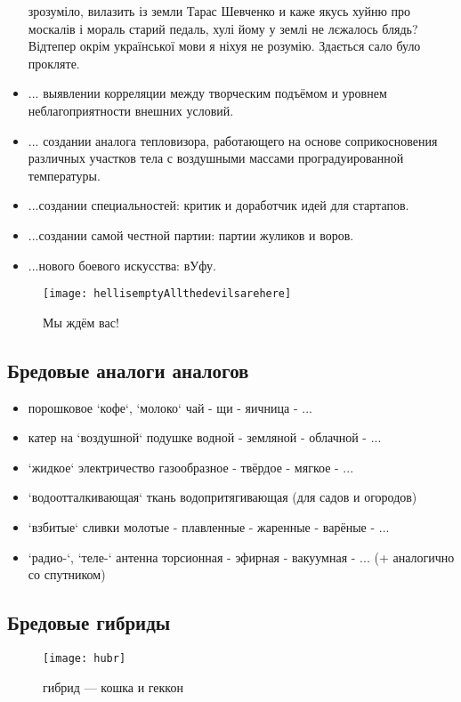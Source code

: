 \begin{itemize}
{            зрозуміло, вилазить із земли Тарас Шевченко и каже якусь хуйню про москалів і мораль старий педаль, 
            хулі йому у землі не лєжалось блядь? Відтепер окрім української мови я ніхуя не розумію. Здається 
            сало було прокляте.}
    \item ... выявлении корреляции между творческим подъёмом и уровнем неблагоприятности внешних условий.
    \item ... создании аналога тепловизора, работающего на основе соприкосновения различных участков тела с воздушными массами проградуированной температуры.
    \item ...создании специальностей: критик и доработчик идей для стартапов.
    \item ...создании самой честной партии: партии жуликов и воров.
    \item ...нового боевого искусства: вУфу.
\end{itemize}
\begin{figure}[ht!]
    \centering
    \texttt{[image: hellisemptyAllthedevilsarehere]}
    \caption{Мы ждём вас!}
\end{figure}

\subsection{Бредовые аналоги аналогов}
\begin{itemize}
\item порошковое `кофе`, `молоко` \to чай - щи - яичница - ...
\item катер на `воздушной` подушке \to водной - земляной - облачной - ...
\item `жидкое` электричество \to газообразное - твёрдое - мягкое - ...
\item `водоотталкивающая` ткань \to водопритягивающая (для садов и огородов)
\item `взбитые` сливки \to молотые - плавленные - жаренные - варёные - ...
\item `радио-`, `теле-` антенна \to торсионная - эфирная - вакуумная - ... (+ аналогично со спутником)
\end{itemize}
\subsection{Бредовые гибриды}

\begin{figure}[ht!]
    \centering
    \texttt{[image: hubr]}
    \caption{гибрид --- кошка и геккон}
\end{figure}

